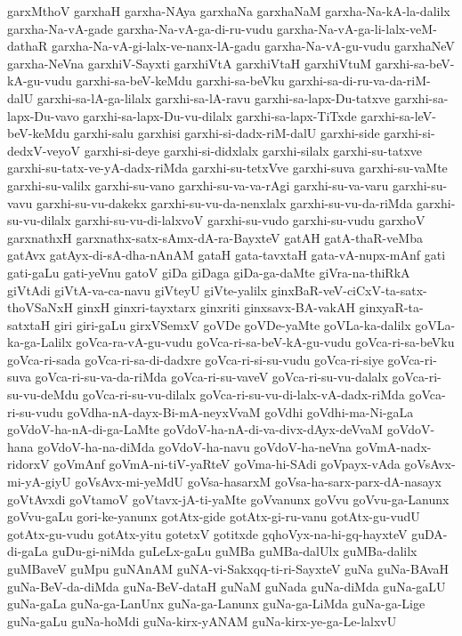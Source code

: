{garxMthoV
garxhaH
garxha-NAya
garxhaNa
garxhaNaM
garxha-Na-kA-la-dalilx
garxha-Na-vA-gade
garxha-Na-vA-ga-di-ru-vudu
garxha-Na-vA-ga-li-lalx-veM-dathaR
garxha-Na-vA-gi-lalx-ve-nanx-lA-gadu
garxha-Na-vA-gu-vudu
garxhaNeV
garxha-NeVna
garxhiV-Sayxti
garxhiVtA
garxhiVtaH
garxhiVtuM
garxhi-sa-beV-kA-gu-vudu
garxhi-sa-beV-keMdu
garxhi-sa-beVku
garxhi-sa-di-ru-va-da-riM-dalU
garxhi-sa-lA-ga-lilalx
garxhi-sa-lA-ravu
garxhi-sa-lapx-Du-tatxve
garxhi-sa-lapx-Du-vavo
garxhi-sa-lapx-Du-vu-dilalx
garxhi-sa-lapx-TiTxde
garxhi-sa-leV-beV-keMdu
garxhi-salu
garxhisi
garxhi-si-dadx-riM-dalU
garxhi-side
garxhi-si-dedxV-veyoV
garxhi-si-deye
garxhi-si-didxlalx
garxhi-silalx
garxhi-su-tatxve
garxhi-su-tatx-ve-yA-dadx-riMda
garxhi-su-tetxVve
garxhi-suva
garxhi-su-vaMte
garxhi-su-valilx
garxhi-su-vano
garxhi-su-va-va-rAgi
garxhi-su-va-varu
garxhi-su-vavu
garxhi-su-vu-dakekx
garxhi-su-vu-da-nenxlalx
garxhi-su-vu-da-riMda
garxhi-su-vu-dilalx
garxhi-su-vu-di-lalxvoV
garxhi-su-vudo
garxhi-su-vudu
garxhoV
garxnathxH
garxnathx-satx-sAmx-dA-ra-BayxteV
gatAH
gatA-thaR-veMba
gatAvx
gatAyx-di-sA-dha-nAnAM
gataH
gata-tavxtaH
gata-vA-nupx-mAnf
gati
gati-gaLu
gati-yeVnu
gatoV
giDa
giDaga
giDa-ga-daMte
giVra-na-thiRkA
giVtAdi
giVtA-va-ca-navu
giVteyU
giVte-yalilx
ginxBaR-veV-ciCxV-ta-satx-thoVSaNxH
ginxH
ginxri-tayxtarx
ginxriti
ginxsavx-BA-vakAH
ginxyaR-ta-satxtaH
giri
giri-gaLu
girxVSemxV
goVDe
goVDe-yaMte
goVLa-ka-dalilx
goVLa-ka-ga-Lalilx
goVca-ra-vA-gu-vudu
goVca-ri-sa-beV-kA-gu-vudu
goVca-ri-sa-beVku
goVca-ri-sada
goVca-ri-sa-di-dadxre
goVca-ri-si-su-vudu
goVca-ri-siye
goVca-ri-suva
goVca-ri-su-va-da-riMda
goVca-ri-su-vaveV
goVca-ri-su-vu-dalalx
goVca-ri-su-vu-deMdu
goVca-ri-su-vu-dilalx
goVca-ri-su-vu-di-lalx-vA-dadx-riMda
goVca-ri-su-vudu
goVdha-nA-dayx-Bi-mA-neyxVvaM
goVdhi
goVdhi-ma-Ni-gaLa
goVdoV-ha-nA-di-ga-LaMte
goVdoV-ha-nA-di-va-divx-dAyx-deVvaM
goVdoV-hana
goVdoV-ha-na-diMda
goVdoV-ha-navu
goVdoV-ha-neVna
goVmA-nadx-ridorxV
goVmAnf
goVmA-ni-tiV-yaRteV
goVma-hi-SAdi
goVpayx-vAda
goVsAvx-mi-yA-giyU
goVsAvx-mi-yeMdU
goVsa-hasarxM
goVsa-ha-sarx-parx-dA-nasayx
goVtAvxdi
goVtamoV
goVtavx-jA-ti-yaMte
goVvanunx
goVvu
goVvu-ga-Lanunx
goVvu-gaLu
gori-ke-yanunx
gotAtx-gide
gotAtx-gi-ru-vanu
gotAtx-gu-vudU
gotAtx-gu-vudu
gotAtx-yitu
gotetxV
gotitxde
gqhoVyx-na-hi-gq-hayxteV
guDA-di-gaLa
guDu-gi-niMda
guLeLx-gaLu
guMBa
guMBa-dalUlx
guMBa-dalilx
guMBaveV
guMpu
guNAnAM
guNA-vi-Sakxqq-ti-ri-SayxteV
guNa
guNa-BAvaH
guNa-BeV-da-diMda
guNa-BeV-dataH
guNaM
guNada
guNa-diMda
guNa-gaLU
guNa-gaLa
guNa-ga-LanUnx
guNa-ga-Lanunx
guNa-ga-LiMda
guNa-ga-Lige
guNa-gaLu
guNa-hoMdi
guNa-kirx-yANAM
guNa-kirx-ye-ga-Le-lalxvU
}
